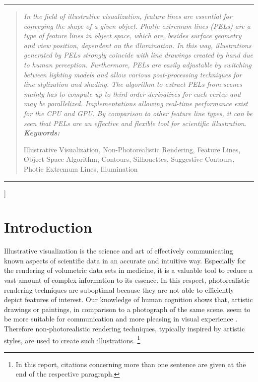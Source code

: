 \documentclass[9pt,fleqn,twoside,twocolumn]{stdglobal}
\begin{document}
{\begin{@twocolumnfalse}
\begin{center}
  \end{center}
  \vspace{2em}
  \hrule
  \begin{abstract}
    \itshape
    \noindent
    In the field of illustrative visualization, feature lines are essential for conveying the shape of a given object.
    Photic extremum lines (PELs) are a type of feature lines in object space, which are, besides surface geometry and view position, dependent on the illumination.
    In this way, illustrations generated by PELs strongly coincide with line drawings created by hand due to human perception.
    Furthermore, PELs are easily adjustable by switching between lighting models and allow various post-processing techniques for line stylization and shading.
    The algorithm to extract PELs from scenes mainly has to compute up to third-order derivatives for each vertex and may be parallelized.
    Implementations allowing real-time performance exist for the CPU and GPU.
    By comparison to other feature line types, it can be seen that PELs are an effective and flexible tool for scientific illustration.
    \\

    \noindent
    \textbf{Keywords:}
    \parbox[t]{0.8\textwidth}{Illustrative Visualization, Non-Photorealistic Rendering, Feature Lines, Object-Space Algorithm, Contours, Silhouettes, Suggestive Contours, Photic Extremum Lines, Illumination}
  \end{abstract}
  \hrule
  \vspace{3em}
\end{@twocolumnfalse}}]

\section{Introduction}
  Illustrative visualization is the science and art of effectively communicating known aspects of scientific data in an accurate and intuitive way.
  Especially for the rendering of volumetric data sets in medicine, it is a valuable tool to reduce a vast amount of complex information to its essence.
  In this respect, photorealistic rendering techniques are suboptimal because they are not able to efficiently depict features of interest.
  Our knowledge of human cognition shows that, artistic drawings or paintings, in comparison to a photograph of the same scene, seem to be more suitable for communication and more pleasing in visual experience \autocite{xie2007}.
  Therefore non-photorealistic rendering techniques, typically inspired by artistic styles, are used to create such illustrations.
  \autocite{viola2005}%
  \footnote{In this report, citations concerning more than one sentence are given at the end of the respective paragraph.}
\end{document}
